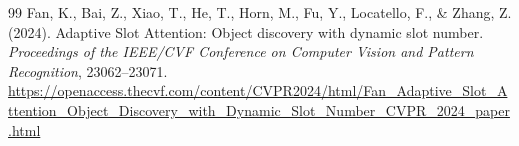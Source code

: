 \documentclass[12pt,a4paper]{article}
\begin{document}
\begin{thebibliography}{99}
Fan, K., Bai, Z., Xiao, T., He, T., Horn, M., Fu, Y., Locatello, F., \& Zhang, Z. (2024).
Adaptive Slot Attention: Object discovery with dynamic slot number.
\textit{Proceedings of the IEEE/CVF Conference on Computer Vision and Pattern Recognition}, 23062--23071.
\url{https://openaccess.thecvf.com/content/CVPR2024/html/Fan_Adaptive_Slot_Attention_Object_Discovery_with_Dynamic_Slot_Number_CVPR_2024_paper.html}

\end{thebibliography}
\end{document}
